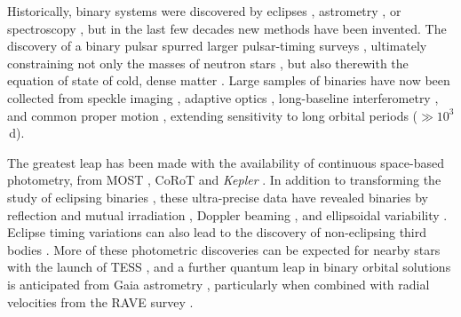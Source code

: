 \documentclass[a4paper,fleqn,usenatbib]{mnras}
\begin{document}
Historically, binary systems were discovered by eclipses \citep{goodricke1783}, astrometry \citep{bessell1844}, or spectroscopy \citep{vogel1889, pickering1890}, but in the last few decades new methods have been invented. The discovery of a binary pulsar \citep{hulse&taylor1975} spurred larger pulsar-timing surveys \citep[e.g.][]{manchesteretal1978,lorimeretal2015,lyneetal2017}, ultimately constraining not only the masses of neutron stars \citep{antoniadisetal2016}, but also therewith the equation of state of cold, dense matter \citep{ozel&freire2016}. Large samples of binaries have now been collected from speckle imaging \citep{hartkopfetal1996,davidsonetal2009,tokovinin2012}, adaptive optics \citep{tokovininetal1999,shatsky&tokovinin2002,jansonetal2013,derosaetal2014}, long-baseline interferometry \citep[LBI,][]{rizzutoetal2013}, and common proper motion \citep{abtetal1990,catalanetal2008}, extending sensitivity to long orbital periods ($\gg10^3$\,d).

The greatest leap has been made with the availability of continuous space-based photometry, from MOST \citep{walkeretal2003}, CoRoT \citep{auvergneetal2009} and \textit{Kepler} \citep{boruckietal2010}. In addition to transforming the study of eclipsing binaries \citep{prsaetal2011}, these ultra-precise data have revealed binaries by reflection and mutual irradiation \citep{gropp&prsa2016}, Doppler beaming \citep{bloemenetal2011}, and ellipsoidal variability \citep{welshetal2010}. Eclipse timing variations can also lead to the discovery of non-eclipsing third bodies \citep{conroyetal2014}. More of these photometric discoveries can be expected for nearby stars with the launch of TESS \citep{rickeretal2015}, and a further quantum leap in binary orbital solutions is anticipated from Gaia astrometry \citep{debruijne2012}, particularly when combined with radial velocities from the RAVE survey \citep{zwitter&munari2004,steinmetzetal2006}.
\end{document}
